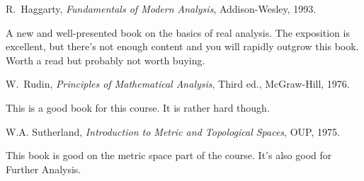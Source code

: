 \documentclass{notes}
\theoremstyle{plain}
\begin{document}
\backmatter

\begin{thebibliography}{9}

 R.~Haggarty, \emph{Fundamentals of Modern
    Analysis}, Addison-Wesley, 1993.
  
  {\sffamily \small A new and well-presented book on the basics of
    real analysis.  The exposition is excellent, but there's not
    enough content and you will rapidly outgrow this book.  Worth a
    read but probably not worth buying. }

 W.~Rudin, \emph{Principles of Mathematical Analysis},
  Third ed., McGraw-Hill, 1976.
  
  {\sffamily \small This is a good book for this course.  It is rather
    hard though. }

 W.A. Sutherland, \emph{Introduction to Metric and
    Topological Spaces}, OUP, 1975.

  {\sffamily \small This book is good on the metric space part of the
  course.  It's also good for Further Analysis. }

\end{thebibliography}
\end{document}
